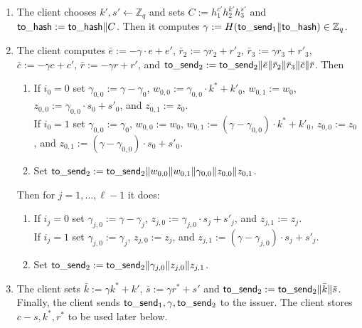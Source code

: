 \documentclass[11pt]{article}
\def\send{{\sf to}\mbox{\_}{\sf send}}
\def\hash{{\sf to}\mbox{\_}{\sf hash}}
\def\Z{{\mathbb Z}}
\def\Z{{\mathbb Z}}
\begin{document}
\begin{itemize}
\begin{enumerate}
    \item The client chooses $k', s'\leftarrow \Z_q$ and sets $C:=h_1^{c'}h_2^{k'} h_3^{s'}$ and $\hash:=\hash\|C$. Then it computes $\gamma := H(\send_1\|\hash) \in \Z_q$.
        \item The client computes $\bar e := -\gamma \cdot e + e'$, $\bar r_2 := \gamma r_2 + r'_2$, $\bar r_3:=\gamma r_3 + r'_3$, $\bar c:=-\gamma c+c'$, $\bar r:=-\gamma r + r'$, and $\send_2:=\send_2\|\bar e\| \bar r_2 \| \bar r_3 \| \bar c \| \bar r$. 
        Then
  \begin{enumerate}
    \item If $i_0=0$ set $\gamma_{0,0}:=\gamma-\gamma_0$, $w_{0,0}:=\gamma_{0,0} \cdot k^*+k'_0$, 
    $w_{0,1}:=w_0$,
    $z_{0,0}:=\gamma_{0,0}\cdot s_0+s'_0$, and $z_{0,1}:=z_0$.\\
    If $i_0=1$ set $\gamma_{0,0}:=\gamma_0$, $w_{0,0}:=w_0$, $w_{0,1}:= (\gamma-\gamma_{0,0}) \cdot k^*+k'_0$,
    $z_{0,0}:=z_0$, and $z_{0,1}:=(\gamma-\gamma_{0,0}) \cdot s_0+s'_0$. 
    \item Set $\send_2:=\send_2\|w_{0,0}\|w_{0,1}\|\gamma_{0,0}\|z_{0,0}\|z_{0,1}$.
\end{enumerate}      
        Then for $j=1, \ldots, \ell-1$ it does:
\begin{enumerate}
    \item If $i_j=0$ set $\gamma_{j,0}:=\gamma-\gamma_j$, $z_{j,0}:=\gamma_{j,0}\cdot s_j+s'_j$, and $z_{j,1}:=z_j$.\\
    If $i_j=1$ set $\gamma_{j,0}:=\gamma_j$, %
    $z_{j,0}:=z_j$, and $z_{j,1}:=(\gamma-\gamma_{j,0}) \cdot s_j+s'_j$. 
    \item Set $\send_2:=\send_2\|\gamma_{j,0}\|z_{j,0}\|z_{j,1}$.
\end{enumerate}
\item The client sets $\bar k:= \gamma k^* + k'$, $\bar s := \gamma r^* + s'$ and $\send_2:=\send_2\|\bar k\|\bar s$.
Finally, the client sends $\send_1, \gamma, \send_2$ to the issuer.
The client stores $c-s, k^*, r^*$ to be used later below.



\end{enumerate}
\end{itemize}
\end{document}
